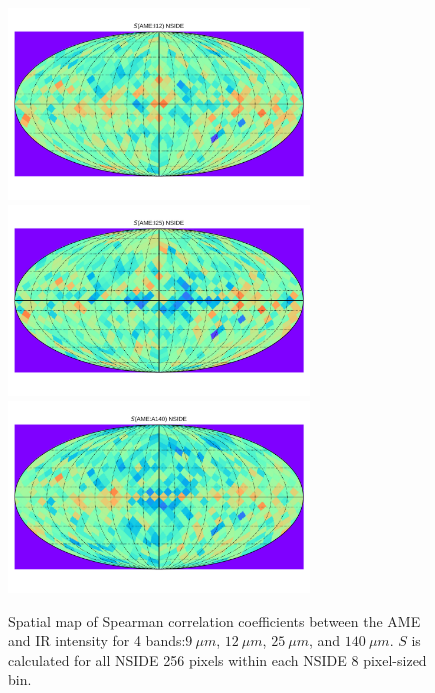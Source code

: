 \begin{figure}
        \includegraphics[width=80mm]{../Plots/Allsky_Corr/RadNorm/Spearman_Map_nside8_AMEtoI12.pdf}
        \includegraphics[width=80mm]{../Plots/Allsky_Corr/RadNorm/Spearman_Map_nside8_AMEtoI25.pdf}
        \includegraphics[width=80mm]{../Plots/Allsky_Corr/RadNorm/Spearman_Map_nside8_AMEtoA140.pdf}
        \centering
        \caption{Spatial map of Spearman correlation coefficients between the AME and IR intensity for 4 bands:$9~\mu{}m$, $12~\mu{}m$, $25~\mu{}m$, and $140~\mu{}m$. $S$ is calculated for all NSIDE 256 pixels within each NSIDE 8 pixel-sized bin.}
      \end{figure}
